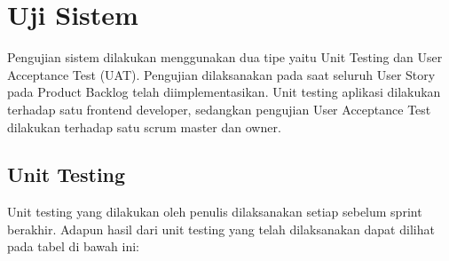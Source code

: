 









% 

\section{Uji Sistem}
Pengujian sistem dilakukan menggunakan dua tipe yaitu Unit Testing dan User Acceptance Test (UAT). Pengujian dilaksanakan pada saat seluruh User Story pada Product Backlog telah diimplementasikan. Unit testing aplikasi dilakukan terhadap satu frontend developer, sedangkan pengujian User Acceptance Test dilakukan terhadap satu scrum master dan owner.

\subsection {Unit Testing}

Unit testing yang dilakukan oleh penulis dilaksanakan setiap sebelum sprint berakhir. Adapun hasil dari unit testing yang telah dilaksanakan dapat dilihat pada tabel di bawah ini:

